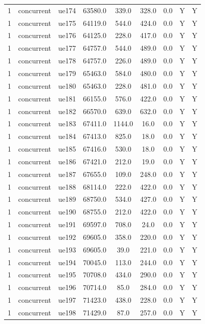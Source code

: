 \begin{table}[ht]
\begin{tabular}{|c|c|c|c|c|c|c|c|c|}
1 & concurrent & ue174 & 63580.0 & 339.0 & 328.0 & 0.0 & Y & Y \\
1 & concurrent & ue175 & 64119.0 & 544.0 & 424.0 & 0.0 & Y & Y \\
1 & concurrent & ue176 & 64125.0 & 228.0 & 417.0 & 0.0 & Y & Y \\
1 & concurrent & ue177 & 64757.0 & 544.0 & 489.0 & 0.0 & Y & Y \\
1 & concurrent & ue178 & 64757.0 & 226.0 & 489.0 & 0.0 & Y & Y \\
1 & concurrent & ue179 & 65463.0 & 584.0 & 480.0 & 0.0 & Y & Y \\
1 & concurrent & ue180 & 65463.0 & 228.0 & 481.0 & 0.0 & Y & Y \\
1 & concurrent & ue181 & 66155.0 & 576.0 & 422.0 & 0.0 & Y & Y \\
1 & concurrent & ue182 & 66570.0 & 639.0 & 632.0 & 0.0 & Y & Y \\
1 & concurrent & ue183 & 67411.0 & 1144.0 & 16.0 & 0.0 & Y & Y \\
1 & concurrent & ue184 & 67413.0 & 825.0 & 18.0 & 0.0 & Y & Y \\
1 & concurrent & ue185 & 67416.0 & 530.0 & 18.0 & 0.0 & Y & Y \\
1 & concurrent & ue186 & 67421.0 & 212.0 & 19.0 & 0.0 & Y & Y \\
1 & concurrent & ue187 & 67655.0 & 109.0 & 248.0 & 0.0 & Y & Y \\
1 & concurrent & ue188 & 68114.0 & 222.0 & 422.0 & 0.0 & Y & Y \\
1 & concurrent & ue189 & 68750.0 & 534.0 & 427.0 & 0.0 & Y & Y \\
1 & concurrent & ue190 & 68755.0 & 212.0 & 422.0 & 0.0 & Y & Y \\
1 & concurrent & ue191 & 69597.0 & 708.0 & 24.0 & 0.0 & Y & Y \\
1 & concurrent & ue192 & 69605.0 & 358.0 & 220.0 & 0.0 & Y & Y \\
1 & concurrent & ue193 & 69605.0 & 39.0 & 221.0 & 0.0 & Y & Y \\
1 & concurrent & ue194 & 70045.0 & 113.0 & 244.0 & 0.0 & Y & Y \\
1 & concurrent & ue195 & 70708.0 & 434.0 & 290.0 & 0.0 & Y & Y \\
1 & concurrent & ue196 & 70714.0 & 85.0 & 284.0 & 0.0 & Y & Y \\
1 & concurrent & ue197 & 71423.0 & 438.0 & 228.0 & 0.0 & Y & Y \\
1 & concurrent & ue198 & 71429.0 & 87.0 & 257.0 & 0.0 & Y & Y \\

\end{tabular}
\end{table}
